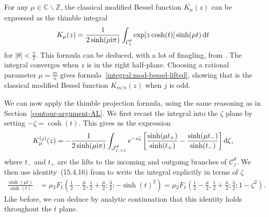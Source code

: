 \documentclass[10pt,a4paper]{amsart}
\newcommand{\Z}{\mathbb{Z}}
\newcommand{\C}{\mathbb{C}}
\numberwithin{equation}{section}
\begin{document}
For any $\mu \in \C \smallsetminus \Z$, the classical modified Bessel function $K_\mu(z)$ can be expressed as the thimble integral
\begin{equation}\label{int:mod-bessel-gen}
 K_\mu(z) = \frac{1}{2 \sinh(\mu {\rm i}\pi)} \int_{\mathcal{C}^\theta_1} \exp[z \cosh(t)] \sinh(\mu t) \,{\rm d}t
\end{equation}
for $|\theta| < \frac{\pi}{2}$. This formula can be deduced, with a lot of finagling, from \cite[formulas~(10.32.12) and~(10.27.4)]{dlmf}. The integral converges when $z$ is in the right half-plane. Choosing a rational parameter $\mu = \frac{m}{n}$ gives formula~\eqref{integral:mod-bessel-lifted}, showing that  is the classical modified Bessel function $K_{m/n}(z)$ when $j$ is odd.

We can now apply the thimble projection formula, using the same reasoning as in Section~\ref{contour-argument-AL}. We first recast the integral into the $\zeta$ plane by setting $-\zeta = \cosh(t)$. This gives us the expression
\[ K^{(j)}_\mu(z) = -\frac{1}{2\sinh(\mu {\rm i}\pi)} \int_{\mathcal{J}^\theta_{\zeta, \mp 1}} {\rm e}^{-z\zeta} \left[ \frac{\sinh(\mu t_+)}{\sinh(t_+)} - \frac{\sinh(\mu t_-)}{\sinh(t_-)} \right] {\rm d}\zeta, \]
where $t_-$ and $t_+$ are the lifts to the incoming and outgoing branches of $\mathcal{C}^\theta_j$. We then use identity~(15.4.16) from \cite{dlmf} to write the integral explicitly in terms of $\zeta$
\begin{align*}
\frac{\sinh(\mu t)}{\sinh(t)} & = \mu {}_2F_1\left(\frac{1}{2} - \frac{\mu}{2}, \frac{1}{2} + \frac{\mu}{2}; \frac{3}{2}; -\sinh(t)^2\right) = \mu {}_2F_1\left(\frac{1}{2} - \frac{\mu}{2}, \frac{1}{2} + \frac{\mu}{2}; \frac{3}{2}; 1 - \zeta^2\right).
\end{align*}
Like before, we can deduce by analytic continuation that this identity holds throughout the $t$ plane.
\end{document}
